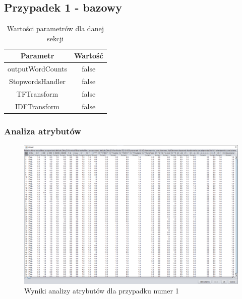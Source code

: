 \documentclass[../EDI_Task2_Karwowski_Kowalewski.tex]{subfiles}
\begin{document}
 {

    \subsection{Przypadek 1 - bazowy} {

        \begin{table}[!htbp]
            \small
            \centering
            \begin{tabular}{|c|c|}
                \hline
                Parametr & Wartość \\ \hline
                outputWordCounts & false \\ \hline
                StopwordsHandler & false \\ \hline
                TFTransform & false \\ \hline
                IDFTransform & false \\ \hline
            \end{tabular}
            \caption{Wartości parametrów dla danej sekcji}
        \end{table}
        \FloatBarrier

        \subsubsection{Analiza atrybutów} {

            \begin{figure}[!htbp]
                \centering
                \includegraphics[width=\textwidth]{img/results1/ftims-case1.png}
                \caption{Wyniki analizy atrybutów dla przypadku numer 1}
            \end{figure}
            \FloatBarrier
        }

}}
\end{document}
